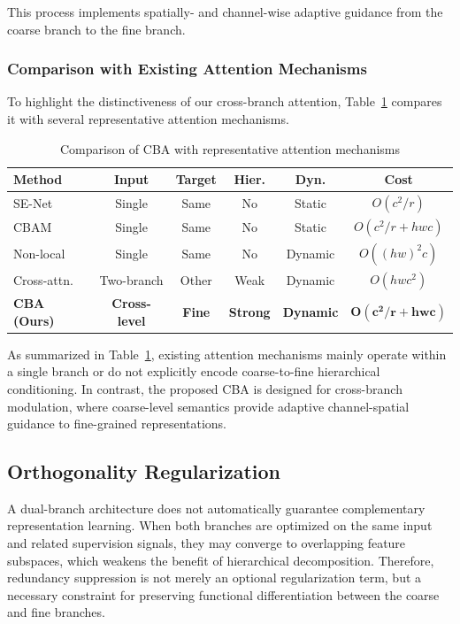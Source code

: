 \documentclass[pdflatex,iicol,sn-mathphys-num]{sn-jnl}
\theoremstyle{thmstyleone}%
\theoremstyle{thmstyletwo}%
\theoremstyle{thmstylethree}%
\begin{document}
This process implements spatially- and channel-wise adaptive guidance from the coarse branch to the fine branch.

\subsubsection{Comparison with Existing Attention Mechanisms}
To highlight the distinctiveness of our cross-branch attention, Table~\ref{tab:attention_comparison} compares it with several representative attention mechanisms.

\begin{table}[h]
    \centering
    \caption{Comparison of CBA with representative attention mechanisms}
    \label{tab:attention_comparison}
    \small
    \setlength{\tabcolsep}{4pt}
    \renewcommand{\arraystretch}{1.05}
    \begin{tabular}{@{}lccccc@{}}
    \toprule
    \textbf{Method} & \textbf{Input} & \textbf{Target} & \textbf{Hier.} & \textbf{Dyn.} & \textbf{Cost} \\
    \midrule
    SE-Net      & Single     & Same  & No   & Static  & $O(c^2/r)$ \\
    CBAM        & Single     & Same  & No   & Static  & $O(c^2/r + hwc)$ \\
    Non-local   & Single     & Same  & No   & Dynamic & $O((hw)^2c)$ \\
    Cross-attn. & Two-branch & Other & Weak & Dynamic & $O(hwc^2)$ \\
    \midrule
    \textbf{CBA (Ours)} & \textbf{Cross-level} & \textbf{Fine} & \textbf{Strong} & \textbf{Dynamic} & $\mathbf{O(c^2/r + hwc)}$ \\
    \bottomrule
    \end{tabular}
    \end{table}

As summarized in Table~\ref{tab:attention_comparison}, existing attention mechanisms mainly operate within a single branch or do not explicitly encode coarse-to-fine hierarchical conditioning. In contrast, the proposed CBA is designed for cross-branch modulation, where coarse-level semantics provide adaptive channel-spatial guidance to fine-grained representations.

\subsection{Orthogonality Regularization}
\label{sec:orth}

A dual-branch architecture does not automatically guarantee complementary representation learning. 
When both branches are optimized on the same input and related supervision signals, they may converge to overlapping feature subspaces, which weakens the benefit of hierarchical decomposition. 
Therefore, redundancy suppression is not merely an optional regularization term, but a necessary constraint for preserving functional differentiation between the coarse and fine branches.
\end{document}
